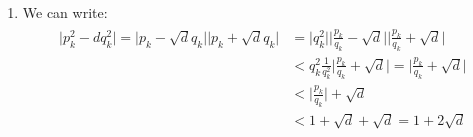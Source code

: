 \begin{enumerate}[label=]
    \item 
        We can write:
        \begin{gather*}
            \begin{split}
                \big|p_k^2 - dq_k^2\big| = \big|p_k - \sqrt{d}q_k\big| \big|p_k + \sqrt{d}q_k\big| & = \big| q_k^2\big| \big|\frac{p_k}{q_k} - \sqrt{d}\big| \big|\frac{p_k}{q_k} + \sqrt{d}\big| \\
                & < q_k^2 \frac{1}{q_k^2} \big|\frac{p_k}{q_k} + \sqrt{d}\big| = \big|\frac{p_k}{q_k} + \sqrt{d}\big|   \\
                & < \big|\frac{p_k}{q_k}\big| + \sqrt{d} \\
                & < 1 + \sqrt{d} + \sqrt{d} = 1 + 2\sqrt{d}
            \end{split}
        \end{gather*}
\end{enumerate}